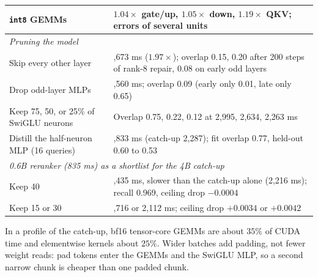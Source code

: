 \documentclass[11pt, a4paper]{article}
\begin{document}
\begin{table}[h]
\begin{tabular}{l>{\raggedright\arraybackslash}p{7.4cm}}
\texttt{int8} GEMMs & $1.04\times$ gate/up, $1.05\times$ down, $1.19\times$ QKV; errors of several units \\
\midrule
\multicolumn{2}{l}{\emph{Pruning the model}} \\
Skip every other layer & 1,673 ms ($1.97\times$); overlap 0.15, 0.20 after 200 steps of rank-8 repair, 0.08 on early odd layers \\
Drop odd-layer MLPs & 2,560 ms; overlap 0.09 (early only 0.01, late only 0.65) \\
Keep 75, 50, or 25\% of SwiGLU neurons & Overlap 0.75, 0.22, 0.12 at 2,995, 2,634, 2,263 ms \\
Distill the half-neuron MLP (16 queries) & 1,833 ms (catch-up 2,287); fit overlap 0.77, held-out 0.60 to 0.53 \\
\midrule
\multicolumn{2}{l}{\emph{0.6B reranker (835 ms) as a shortlist for the 4B catch-up}} \\
Keep 40 & 2,435 ms, slower than the catch-up alone (2,216 ms); recall 0.969, ceiling drop $-0.0004$ \\
Keep 15 or 30 & 1,716 or 2,112 ms; ceiling drop $+0.0034$ or $+0.0042$ \\
\bottomrule
\end{tabular}
\end{table}

In a profile of the catch-up, bf16 tensor-core GEMMs are about $35\%$ of CUDA time and elementwise kernels about $25\%$.
Wider batches add padding, not fewer weight reads: pad tokens enter the GEMMs and the SwiGLU MLP, so a second narrow chunk is cheaper than one padded chunk.
\end{document}
